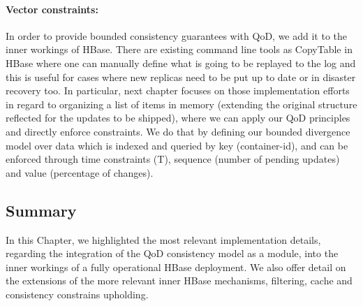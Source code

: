 \paragraph*{Vector constraints:}
In order to provide bounded consistency guarantees with QoD, we add it to the inner workings of HBase. There are existing command line tools as CopyTable in HBase where one can manually define what is going to be replayed to the log and this is useful for cases where new replicas need to be put up to date or in disaster recovery too. In particular, next chapter focuses on those implementation efforts in regard to organizing a list of items in memory (extending the original structure reflected for the updates to be shipped), where we can apply our QoD principles and directly enforce constraints. We do that by defining our bounded divergence model over data which is indexed and queried by key (container-id), and can be enforced through time constraints (T), sequence (number of pending updates) and value (percentage of changes).


\subsection*{Summary}\label{summary-implementation}

In this Chapter, we highlighted the most relevant implementation details, regarding the integration of the QoD consistency model as a module, into the inner workings of a fully operational HBase deployment. We also offer detail on the extensions of the more relevant inner HBase mechanisms, filtering, cache and consistency constrains upholding.




